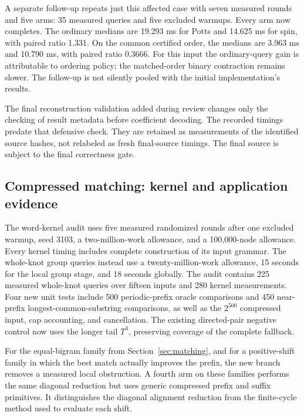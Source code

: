 A separate follow-up repeats just this affected case with seven measured
rounds and five arms: 35 measured queries and five excluded warmups. Every
arm now completes. The ordinary medians are 19.293 ms for Potts and
14.625 ms for spin, with paired ratio 1.331. On the common certified order,
the medians are 3.963 ms and 10.790 ms, with paired ratio 0.3666.
For this input the ordinary-query gain is attributable to ordering policy;
the matched-order binary contraction remains slower. The follow-up is not
silently pooled with the initial implementation's results.

The final reconstruction validation added during review changes only
the checking of result metadata before coefficient decoding. The recorded
timings predate that defensive check. They are retained as measurements of
the identified source hashes, not relabeled as fresh final-source timings.
The final source is subject to the final correctness gate.

\subsection{Compressed matching: kernel and application evidence}

The word-kernel audit uses five measured randomized rounds after one excluded
warmup, seed 3103, a two-million-work allowance, and a 100,000-node allowance.
Every kernel timing includes complete construction of its input grammar.
The whole-knot group queries instead use a twenty-million-work allowance,
15 seconds for the local group stage, and 18 seconds globally.
The audit contains 225 measured whole-knot queries over fifteen inputs and
280 kernel measurements. Four new unit tests include 500 periodic-prefix
oracle comparisons and 450 near-prefix longest-common-substring
comparisons, as well as the $2^{500}$ compressed input, cap accounting,
and cancellation. The existing directed-pair negative control now uses
the longer tail $T^3$, preserving coverage of the complete fallback.

For the equal-bigram family from Section~\ref{sec:matching}, and for a
positive-shift family in which the best match actually improves the prefix,
the new branch removes a measured local obstruction. A fourth arm on these
families performs the same diagonal reduction but uses generic compressed
prefix and suffix primitives. It distinguishes the diagonal alignment
reduction from the finite-cycle method used to evaluate each shift.

